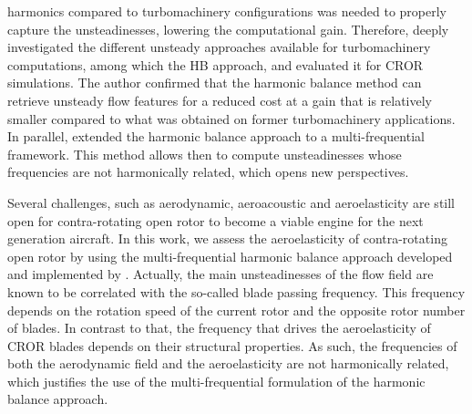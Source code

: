 harmonics compared to turbomachinery configurations
was needed to properly capture the unsteadinesses, lowering
the computational gain.
Therefore, \citet{ThesisFrancois} deeply
investigated the different unsteady approaches available 
for turbomachinery computations, among which the HB approach, 
and evaluated it for CROR simulations. 
The author confirmed that
the harmonic balance method can retrieve unsteady
flow features for a reduced cost at a gain that
is relatively smaller compared to what was
obtained on former turbomachinery applications.
In parallel, \citet{ThesisGuedeney} extended the harmonic
balance approach to a multi-frequential framework. 
This method allows then to compute unsteadinesses whose frequencies
are not harmonically related, which opens new perspectives.
\newline

Several challenges, such as aerodynamic,
aeroacoustic and aeroelasticity are still open 
for contra-rotating open rotor
to become a viable engine for the next generation aircraft.
In this work, we assess the aeroelasticity of 
contra-rotating open rotor by using the multi-frequential
harmonic balance approach developed and implemented 
by \citet{ThesisGuedeney}.
Actually, the main unsteadinesses of the flow field
are known to be correlated with the so-called
blade passing frequency. This frequency depends on the
rotation speed of the current rotor and the opposite rotor
number of blades. In contrast to that, the 
frequency that drives the aeroelasticity of CROR
blades depends on their structural properties.
As such, the frequencies of both the aerodynamic
field and the aeroelasticity are not harmonically
related, which justifies the use of the multi-frequential
formulation of the harmonic balance approach.


